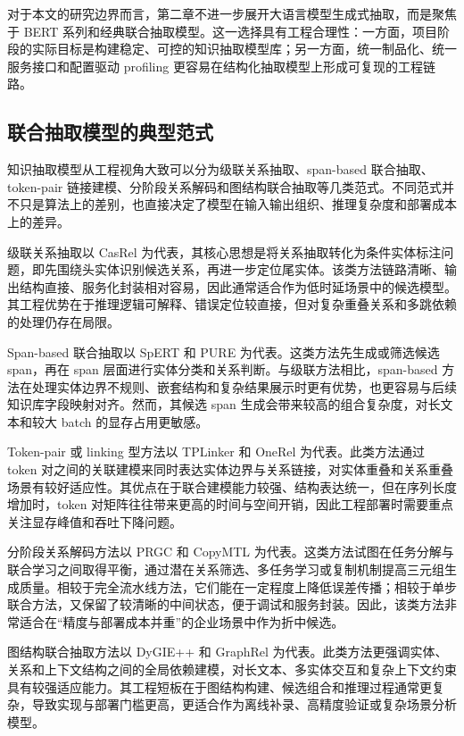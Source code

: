 对于本文的研究边界而言，第二章不进一步展开大语言模型生成式抽取，而是聚焦于 BERT 系列和经典联合抽取模型。这一选择具有工程合理性：一方面，项目阶段的实际目标是构建稳定、可控的知识抽取模型库；另一方面，统一制品化、统一服务接口和配置驱动 profiling 更容易在结构化抽取模型上形成可复现的工程链路。

\subsection{联合抽取模型的典型范式}
知识抽取模型从工程视角大致可以分为级联关系抽取、span-based 联合抽取、token-pair 链接建模、分阶段关系解码和图结构联合抽取等几类范式。不同范式并不只是算法上的差别，也直接决定了模型在输入输出组织、推理复杂度和部署成本上的差异。

级联关系抽取以 CasRel 为代表，其核心思想是将关系抽取转化为条件实体标注问题，即先围绕头实体识别候选关系，再进一步定位尾实体\cite{casrel2020}。该类方法链路清晰、输出结构直接、服务化封装相对容易，因此通常适合作为低时延场景中的候选模型。其工程优势在于推理逻辑可解释、错误定位较直接，但对复杂重叠关系和多跳依赖的处理仍存在局限。

Span-based 联合抽取以 SpERT 和 PURE 为代表\cite{spert2019,pure2021}。这类方法先生成或筛选候选 span，再在 span 层面进行实体分类和关系判断。与级联方法相比，span-based 方法在处理实体边界不规则、嵌套结构和复杂结果展示时更有优势，也更容易与后续知识库字段映射对齐。然而，其候选 span 生成会带来较高的组合复杂度，对长文本和较大 batch 的显存占用更敏感。

Token-pair 或 linking 型方法以 TPLinker 和 OneRel 为代表\cite{tplinker2020,onerel2022}。此类方法通过 token 对之间的关联建模来同时表达实体边界与关系链接，对实体重叠和关系重叠场景有较好适应性。其优点在于联合建模能力较强、结构表达统一，但在序列长度增加时，token 对矩阵往往带来更高的时间与空间开销，因此工程部署时需要重点关注显存峰值和吞吐下降问题。

分阶段关系解码方法以 PRGC 和 CopyMTL 为代表\cite{prgc2021,copymtl2020}。这类方法试图在任务分解与联合学习之间取得平衡，通过潜在关系筛选、多任务学习或复制机制提高三元组生成质量。相较于完全流水线方法，它们能在一定程度上降低误差传播；相较于单步联合方法，又保留了较清晰的中间状态，便于调试和服务封装。因此，该类方法非常适合在“精度与部署成本并重”的企业场景中作为折中候选。

图结构联合抽取方法以 DyGIE++ 和 GraphRel 为代表\cite{luan2018,dygiepp2019,graphrel2019}。此类方法更强调实体、关系和上下文结构之间的全局依赖建模，对长文本、多实体交互和复杂上下文约束具有较强适应能力。其工程短板在于图结构构建、候选组合和推理过程通常更复杂，导致实现与部署门槛更高，更适合作为离线补录、高精度验证或复杂场景分析模型。

